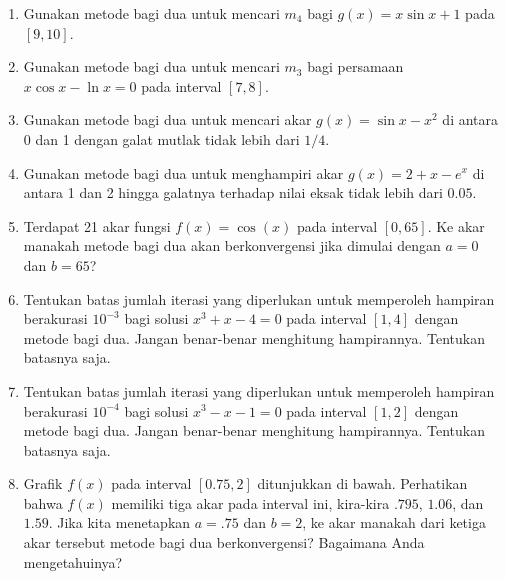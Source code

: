 \begin{enumerate}
\begin{enumerate}
\item $f(x)=\sqrt{x}-\cos x$ pada $[0,1]$
\item $f(x)=3(x+1)(x-\frac{1}{2})(x-1)$ pada $[-1.25,2.5]$
\end{enumerate}
\item \label{enu:useBisection}Gunakan metode bagi dua untuk mencari $m_{4}$
bagi $g(x)=x\sin x+1$ pada $[9,10]$.
\item Gunakan metode bagi dua untuk mencari $m_{3}$ bagi persamaan $x\cos x-\ln x=0$
pada interval $[7,8]$.
\item Gunakan metode bagi dua untuk mencari akar $g(x)=\sin x-x^{2}$ di
antara 0 dan 1 dengan galat mutlak tidak lebih dari $1/4$.
\item Gunakan metode bagi dua untuk menghampiri akar $g(x)=2+x-e^{x}$ di
antara 1 dan 2 hingga galatnya terhadap nilai eksak tidak lebih dari
$0.05$.
\item \label{exc:bisection-2}Terdapat 21 akar fungsi $f(x)=\cos(x)$ pada
interval $[0,65]$. Ke akar manakah metode bagi dua akan berkonvergensi
jika dimulai dengan $a=0$ dan $b=65$? \hasananswer 
\item \label{exc:bisection-1}Tentukan batas jumlah iterasi yang diperlukan
untuk memperoleh hampiran berakurasi $10^{-3}$ bagi solusi $x^{3}+x-4=0$
pada interval $[1,4]$ dengan metode bagi dua. Jangan benar-benar
menghitung hampirannya. Tentukan batasnya saja. \hasasolution 
\item Tentukan batas jumlah iterasi yang diperlukan untuk memperoleh hampiran
berakurasi $10^{-4}$ bagi solusi $x^{3}-x-1=0$ pada interval $[1,2]$
dengan metode bagi dua. Jangan benar-benar menghitung hampirannya.
Tentukan batasnya saja.
\item Grafik $f(x)$ pada interval $[0.75,2]$ ditunjukkan di bawah. Perhatikan
bahwa $f(x)$ memiliki tiga akar pada interval ini, kira-kira $.795$,
$1.06$, dan $1.59$. Jika kita menetapkan $a=.75$ dan $b=2$, ke
akar manakah dari ketiga akar tersebut metode bagi dua berkonvergensi?
Bagaimana Anda mengetahuinya?


\end{enumerate}
